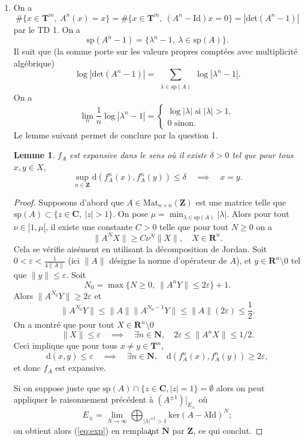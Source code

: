 \documentclass[a4paper,12pt,openany]{article}
\theoremstyle{plain}
\newtheorem{lem}{Lemme}
\theoremstyle{definition}
\newcommand{\dd}{\mathrm{d}}
\newcommand{\T}{\mathbf{T}}
\newcommand{\R}{\mathbf{R}}
\newcommand{\Z}{\mathbf{Z}}
\newcommand{\N}{\mathbf{N}}
\newcommand{\C}{\mathbf{C}}
\begin{document}
\begin{enumerate}
\item On a
$$
\#\{ x \in \T^m,~A^n(x) = x\} = \#\{x \in \T^m,~(A^n-\mathrm{Id})x = 0\} = |\mathrm{det}(A^n-1)|
$$
par le TD 1. On a 
$$
\mathrm{sp}(A^n-1) = \{ \lambda^n - 1,~\lambda \in \mathrm{sp}(A)\}.
$$
 Il suit que (la somme porte sur les valeurs propres compt\'ees avec multiplicit\'e alg\'ebrique)
 $$
\log|\mathrm{det} (A^n-1)| = \sum_{\substack{\lambda \in \mathrm{sp}(A)}} \log |\lambda^n-1|.
$$
On a
$$
\lim_n \frac{1}{n} \log |\lambda^n-1| = \left\{\begin{matrix} \log |\lambda| \text{ si }|\lambda| > 1, \\ 0 \text{ sinon.}
\end{matrix} \right.
$$
Le lemme suivant permet de conclure par la question 1.
\begin{lem}
$f_A$ est expansive dans le sens o\`u il existe $\delta > 0$ tel que pour tous $x,y \in X$,
$$
\sup_{n \in \Z} \dd(f^n_A(x), f^n_A(y)) \leq \delta \quad \implies \quad x = y.
$$
\end{lem}
\begin{proof}
Supposons d'abord que $A \in \mathrm{Mat}_{n \times n}(\Z)$ est une matrice telle que $\mathrm{sp}(A) \subset \{z \in \C,~|z|> 1\}$. On pose $\mu = \min_{\lambda \in \mathrm{sp}(A)} |\lambda|$. Alors pour tout $\nu \in ]1, \mu[$, il existe une constante $C > 0$ telle que pour tout $N \geq 0$ on a 
$$
\|A^NX \| \geq C \nu^N \|X\|, \quad X \in \R^n.
$$
Cela se v\'erifie ais\'ement en utilisant la d\'ecomposition de Jordan. Soit $0 < \varepsilon < \displaystyle{ \frac{1}{4 \|A\|}}$ (ici $\|A\|$ d\'esigne la norme d'op\'erateur de $A$), et $y \in \R^n \setminus 0$ tel que $\|y \|\leq \varepsilon.$ Soit 
$$N_0 = \max\{N \geq 0,~\|A^nY\|\leq 2 \varepsilon\} + 1.$$
Alors $\|A^{N_0}Y\| \geq 2 \varepsilon$ et 
$$
\|A^{N_0}Y\| \leq \|A\|\|A^{N_0-1}Y\|\leq \|A\| (2\varepsilon) \leq \frac{1}{2}.
$$
On a montr\'e que pour tout $X \in \R^{n}\setminus 0$
$$
 \|X\|\leq \varepsilon \quad \implies \quad \exists n \in \N, \quad 2\varepsilon \leq \|A^nX\| \leq 1/2.
$$
Ceci implique que pour tous $x\neq y \in \T^n$,
\begin{equation}\label{eq:exp}
\dd(x, y) \leq \varepsilon \quad \implies \quad \exists n \in \N, \quad \dd(f^n_A(x), f^n_A(y)) \geq 2\varepsilon,
\end{equation}
et donc $f_A$ est expansive.

Si on suppose juste que $\mathrm{sp}(A) \cap \{z \in \C, |z| = 1\} = \emptyset$ alors on peut appliquer le raisonnement pr\'ec\'edent \`a $(A^{\pm 1})|_{E_\pm}$ o\`u
$$
E_\pm = \lim_{N \to \infty} \bigoplus_{|\lambda|^{\pm 1} > 1} \mathrm{ker}(A - \lambda\mathrm{Id})^N ;
$$
on obtient alors (\ref{eq:exp}) en rempla\c ant $\N$ par $\Z$, ce qui conclut.
\end{proof}
\end{enumerate}
\end{document}
